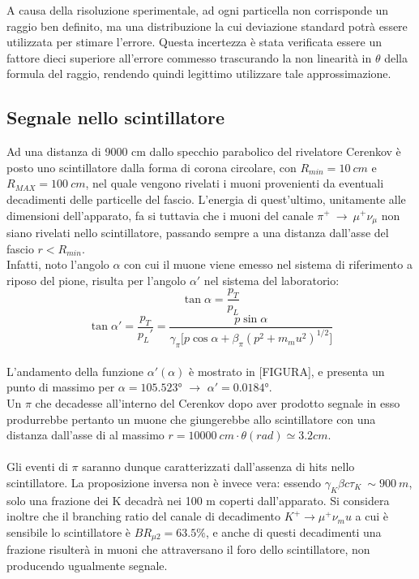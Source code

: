 \documentclass[8pt]{extarticle}
\begin{document}
A causa della risoluzione sperimentale, ad ogni particella non corrisponde un raggio ben definito, ma una distribuzione la cui deviazione standard potrà essere utilizzata per stimare l'errore. Questa incertezza è stata verificata essere un fattore dieci superiore all'errore commesso trascurando la non linearità in $\theta$ della formula del raggio, rendendo quindi legittimo utilizzare tale approssimazione.

\subsection{Segnale nello scintillatore} \label{sub:scint}
Ad una distanza di 9000 cm dallo specchio parabolico del rivelatore Cerenkov è posto uno scintillatore dalla forma di corona circolare, con $R_{min}=10\ cm$ e $R_{MAX}=100\ cm$, nel quale vengono rivelati i muoni provenienti da eventuali decadimenti delle particelle del fascio.
L'energia di quest'ultimo, unitamente alle dimensioni dell'apparato, fa si tuttavia che i muoni del canale $\pi^+ \ \rightarrow \ \mu^+ \nu_\mu$ non siano rivelati nello scintillatore, passando sempre a una distanza dall'asse del fascio $r<R_{min}$. \\
Infatti, noto l'angolo $\alpha$ con cui il muone viene emesso nel sistema di riferimento a riposo del pione, risulta per l'angolo $\alpha'$ nel sistema del laboratorio:
\begin{equation}
\tan{\alpha}=\frac{p_T}{p_L}
\end{equation}
\begin{equation}
\tan{\alpha'}=\frac{p_T}{p_L'}=\frac{p\sin{\alpha}}{\gamma_{\pi}\big[p\cos{\alpha}+\beta_{\pi} (p^2+m_mu^2)^{1/2}\big]}
\end{equation}
\\
L'andamento della funzione $\alpha'(\alpha)$ è mostrato in [FIGURA], e presenta un punto  di massimo per $	\alpha=105.523°$ $\rightarrow$ $\alpha'=0.0184°$.\\
Un $\pi$ che decadesse all'interno del Cerenkov dopo aver prodotto segnale in esso produrrebbe pertanto un muone che giungerebbe allo scintillatore con una distanza dall'asse di al massimo $r=10000\ cm \cdot \theta (rad) \simeq 3.2 cm$.\\
\\
Gli eventi di $\pi$ saranno dunque caratterizzati dall'assenza di hits nello scintillatore. La proposizione inversa non è invece vera: essendo $\gamma_K \beta c \tau_K \ \sim 900 \ m$, solo una frazione dei K decadrà nei 100 m coperti dall'apparato. Si considera inoltre che il branching ratio del canale di decadimento $K^+ \rightarrow \mu^+\nu_mu$ a cui è sensibile lo scintillatore è $BR_{\mu 2}=63.5\%$, e anche di questi decadimenti una frazione risulterà in muoni che attraversano il foro dello scintillatore, non producendo ugualmente segnale.
\\
\end{document}
